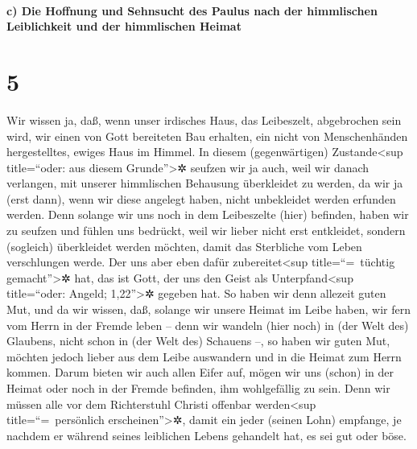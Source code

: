 \hypertarget{c-die-hoffnung-und-sehnsucht-des-paulus-nach-der-himmlischen-leiblichkeit-und-der-himmlischen-heimat}{%
\paragraph{c) Die Hoffnung und Sehnsucht des Paulus nach der himmlischen
Leiblichkeit und der himmlischen
Heimat}\label{c-die-hoffnung-und-sehnsucht-des-paulus-nach-der-himmlischen-leiblichkeit-und-der-himmlischen-heimat}}

\hypertarget{section-4}{%
\section{5}\label{section-4}}

 Wir wissen ja, daß, wenn unser irdisches Haus, das
Leibeszelt, abgebrochen sein wird, wir einen von Gott bereiteten Bau
erhalten, ein nicht von Menschenhänden hergestelltes, ewiges Haus im
Himmel.  In diesem (gegenwärtigen) Zustande\textless sup
title=``oder: aus diesem Grunde''\textgreater✲ seufzen wir ja auch, weil
wir danach verlangen, mit unserer himmlischen Behausung überkleidet zu
werden,  da wir ja (erst dann), wenn wir diese angelegt
haben, nicht unbekleidet werden erfunden werden.  Denn
solange wir uns noch in dem Leibeszelte (hier) befinden, haben wir zu
seufzen und fühlen uns bedrückt, weil wir lieber nicht erst entkleidet,
sondern (sogleich) überkleidet werden möchten, damit das Sterbliche vom
Leben verschlungen werde.  Der uns aber eben dafür
zubereitet\textless sup title=``=~tüchtig gemacht''\textgreater✲ hat,
das ist Gott, der uns den Geist als Unterpfand\textless sup
title=``oder: Angeld; 1,22''\textgreater✲ gegeben hat.  So
haben wir denn allezeit guten Mut, und da wir wissen, daß, solange wir
unsere Heimat im Leibe haben, wir fern vom Herrn in der Fremde leben
 -- denn wir wandeln (hier noch) in (der Welt des)
Glaubens, nicht schon in (der Welt des) Schauens --,  so
haben wir guten Mut, möchten jedoch lieber aus dem Leibe auswandern und
in die Heimat zum Herrn kommen.  Darum bieten wir auch
allen Eifer auf, mögen wir uns (schon) in der Heimat oder noch in der
Fremde befinden, ihm wohlgefällig zu sein.  Denn wir
müssen alle vor dem Richterstuhl Christi offenbar werden\textless sup
title=``=~persönlich erscheinen''\textgreater✲, damit ein jeder (seinen
Lohn) empfange, je nachdem er während seines leiblichen Lebens gehandelt
hat, es sei gut oder böse.

